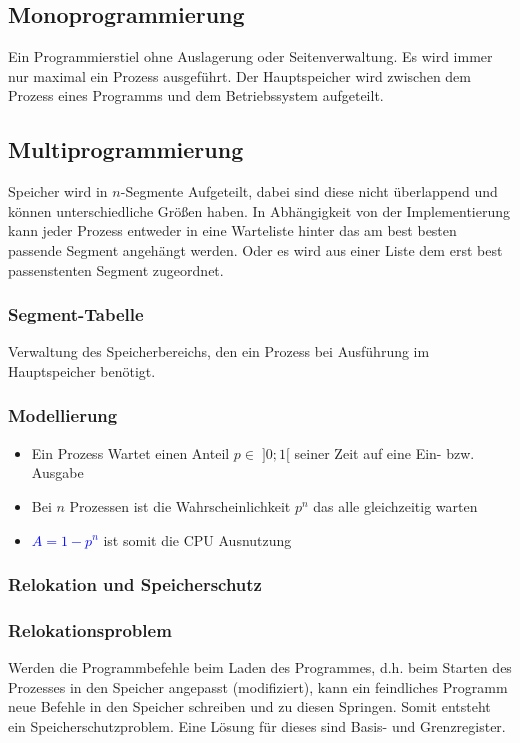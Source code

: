 \documentclass[10pt,a4paper]{article}
\begin{document}
\begin{multicols*}{4}
\subsection{Monoprogrammierung}
Ein Programmierstiel ohne Auslagerung oder Seitenverwaltung. Es wird immer nur maximal ein Prozess ausgeführt. Der
Hauptspeicher wird zwischen dem Prozess eines Programms und dem Betriebssystem aufgeteilt.

\subsection{Multiprogrammierung}
Speicher wird in \(n\)-Segmente Aufgeteilt, dabei sind diese nicht überlappend und können unterschiedliche Größen haben.
In Abhängigkeit von der Implementierung kann jeder Prozess entweder in eine Warteliste hinter das am best besten
passende Segment angehängt werden. Oder es wird aus einer Liste dem erst best passenstenten Segment zugeordnet.

\subsubsection*{Segment-Tabelle}
Verwaltung des Speicherbereichs, den ein Prozess bei Ausführung im Hauptspeicher benötigt.

\subsubsection{Modellierung}
\begin{itemize}
	\item Ein Prozess Wartet einen Anteil \(p \in\; ]0;1[\) seiner Zeit auf eine Ein- bzw. Ausgabe
	\item Bei \(n\) Prozessen ist die Wahrscheinlichkeit \(p^{n}\) das alle gleichzeitig warten
	\item \textcolor{blue}{\(A = 1 - p^{n}\)} ist somit die CPU Ausnutzung
\end{itemize}

\subsubsection{Relokation und Speicherschutz}
\subsubsection*{Relokationsproblem}
Werden die Programmbefehle beim Laden des Programmes, d.h. beim Starten des Prozesses in den Speicher angepasst
(modifiziert), kann ein feindliches Programm neue Befehle in den Speicher schreiben und zu diesen Springen. Somit
entsteht ein Speicherschutzproblem. Eine Lösung für dieses sind Basis- und Grenzregister.


\end{multicols*}
\end{document}
